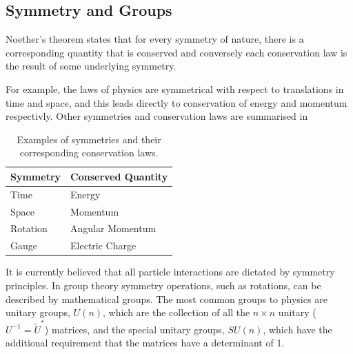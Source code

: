 \subsection{Symmetry and Groups}
Noether's theorem states that for every symmetry of nature, there is
a corresponding quantity that is conserved and conversely each conservation law
is the result of some underlying symmetry.

For example, the laws of physics are symmetrical with respect to translations in
time and space, and this leads directly to conservation of energy and momentum
respectivly. Other symmetries and conservation laws are summarised in

\begin{table}
\begin{center}
\begin{tabular}{ l l }
Symmetry & Conserved Quantity \\ \hline
Time     & Energy \\
Space    & Momentum \\
Rotation & Angular Momentum \\
Gauge    & Electric Charge \\
\end{tabular}
\caption{Examples of symmetries and their corresponding conservation laws.
\label{tab:symmetry}}
\end{center}
\end{table}

It is currently believed that all particle interactions are dictated by symmetry
principles.  In group theory symmetry operations, such as rotations, can be
described by mathematical groups.
The most common groups to physics are unitary groups, $U(n)$, which are the
collection of all the $n\times n$ unitary ($U^{-1} = \tilde{U}^{*}$) matrices, and
the special unitary groups, $SU(n)$, which have the additional requirement that
the matrices have a determinant of 1.

